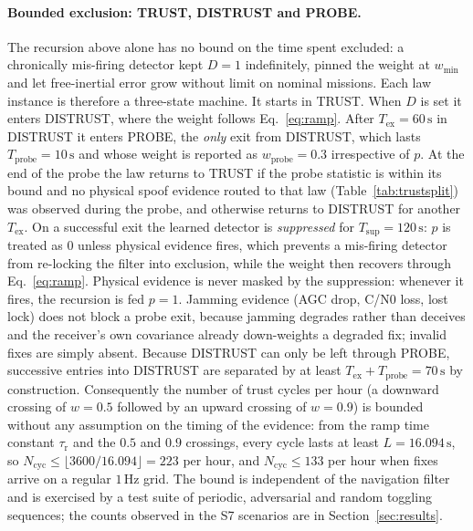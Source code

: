 \documentclass[journal]{IEEEtran}
\begin{document}
\paragraph{Bounded exclusion: TRUST, DISTRUST and PROBE.}
The recursion above alone has no bound on the time spent excluded: a chronically mis-firing detector kept
$D=1$ indefinitely, pinned the weight at $w_{\min}$ and let free-inertial error grow without limit on
nominal missions. Each law instance is therefore a three-state machine. It starts in TRUST. When $D$ is
set it enters DISTRUST, where the weight follows Eq.~\eqref{eq:ramp}. After $T_{\mathrm{ex}} = 60\,\mathrm{s}$
in DISTRUST it enters PROBE, the \emph{only} exit from DISTRUST, which lasts $T_{\mathrm{probe}} = 10\,\mathrm{s}$
and whose weight is reported as $w_{\mathrm{probe}} = 0.3$ irrespective of $p$. At the end of the probe the
law returns to TRUST if the probe statistic is within its bound and no physical spoof evidence
routed to that law (Table~\ref{tab:trustsplit}) was observed during the probe, and otherwise returns to DISTRUST for another
$T_{\mathrm{ex}}$. On a successful exit the learned detector is \emph{suppressed} for
$T_{\mathrm{sup}} = 120\,\mathrm{s}$: $p$ is treated as $0$ unless physical evidence fires, which prevents a
mis-firing detector from re-locking the filter into exclusion, while the weight then recovers through
Eq.~\eqref{eq:ramp}. Physical evidence is never masked by the suppression: whenever it fires, the recursion
is fed $p = 1$. Jamming evidence (AGC drop, C/N0 loss, lost lock) does not block a probe exit, because
jamming degrades rather than deceives and the receiver's own covariance already down-weights a degraded fix;
invalid fixes are simply absent. Because DISTRUST can only be left through PROBE, successive entries into
DISTRUST are separated by at least $T_{\mathrm{ex}} + T_{\mathrm{probe}} = 70\,\mathrm{s}$ by construction.
Consequently the number of trust cycles per hour (a downward crossing of $w = 0.5$ followed by an upward
crossing of $w = 0.9$) is bounded without any assumption on the timing of the evidence: from the ramp time
constant $\tau_{\mathrm{r}}$ and the $0.5$ and $0.9$ crossings, every cycle lasts at least
$L = 16.094\,\mathrm{s}$, so $N_{\mathrm{cyc}} \le \lfloor 3600/16.094 \rfloor = 223$ per hour, and
$N_{\mathrm{cyc}} \le 133$ per hour when fixes arrive on a regular $1\,\mathrm{Hz}$ grid. The bound is
independent of the navigation filter and is exercised by a test suite of periodic, adversarial and random
toggling sequences; the counts observed in the S7 scenarios are in Section~\ref{sec:results}.
\end{document}
